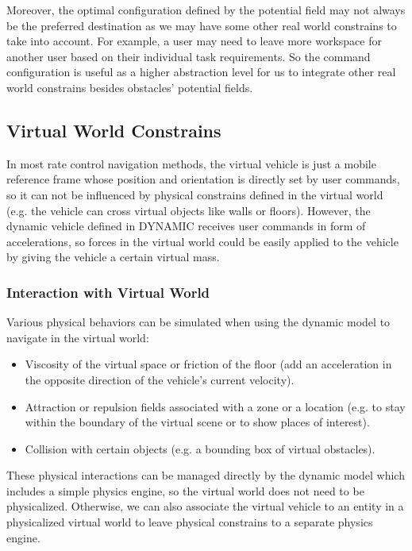 Moreover, the optimal configuration defined by the potential field may not always be the preferred destination as we may have some other real world constrains to take into account. For example, a user may need to leave more workspace for another user based on their individual task requirements. So the command configuration is useful as a higher abstraction level for us to integrate other real world constrains besides obstacles' potential fields. 


\subsection{Virtual World Constrains}
In most rate control navigation methods, the virtual vehicle is just a mobile reference frame whose position and orientation is directly set by user commands, so it can not be influenced by physical constrains defined in the virtual world (e.g. the vehicle can cross virtual objects like walls or floors). However, the dynamic vehicle defined in DYNAMIC receives user commands in form of accelerations, so forces in the virtual world could be easily applied to the vehicle by giving the vehicle a certain virtual mass.

\subsubsection{Interaction with Virtual World}
Various physical behaviors can be simulated when using the dynamic model to navigate in the virtual world:

\begin{itemize}
\item Viscosity of the virtual space or friction of the floor (add an acceleration in the opposite direction of the vehicle's current velocity).
\item Attraction or repulsion fields associated with a zone or a location (e.g. to stay within the boundary of the virtual scene or to show places of interest).
\item Collision with certain objects (e.g. a bounding box of virtual obstacles).
\end{itemize}

These physical interactions can be managed directly by the dynamic model which includes a simple physics engine, so the virtual world does not need to be physicalized. Otherwise, we can also associate the virtual vehicle to an entity in a physicalized virtual world to leave physical constrains to a separate physics engine.

